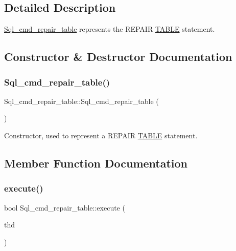 \subsection{Detailed Description}
\mbox{\hyperlink{classSql__cmd__repair__table}{Sql\+\_\+cmd\+\_\+repair\+\_\+table}} represents the R\+E\+P\+A\+IR \mbox{\hyperlink{structTABLE}{T\+A\+B\+LE}} statement. 

\subsection{Constructor \& Destructor Documentation}
\mbox{\label{classSql__cmd__repair__table_ac8c64e909a1a1ec2421255418694b65c}} 
\subsubsection{\texorpdfstring{Sql\+\_\+cmd\+\_\+repair\+\_\+table()}{Sql\_cmd\_repair\_table()}}
{\footnotesize\ttfamily Sql\+\_\+cmd\+\_\+repair\+\_\+table\+::\+Sql\+\_\+cmd\+\_\+repair\+\_\+table (\begin{DoxyParamCaption}{ }\end{DoxyParamCaption})\hspace{0.3cm}{\ttfamily [inline]}}

Constructor, used to represent a R\+E\+P\+A\+IR \mbox{\hyperlink{structTABLE}{T\+A\+B\+LE}} statement. 

\subsection{Member Function Documentation}
\mbox{\label{classSql__cmd__repair__table_abb68d28756b9713e0d46774b3cafe39c}} 
\subsubsection{\texorpdfstring{execute()}{execute()}}
{\footnotesize\ttfamily bool Sql\+\_\+cmd\+\_\+repair\+\_\+table\+::execute (\begin{DoxyParamCaption}\item[{T\+HD $\ast$}]{thd }\end{DoxyParamCaption})\hspace{0.3cm}{\ttfamily [virtual]}}

